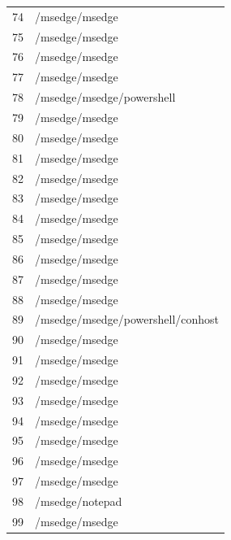 \documentclass[a4paper,twoside,12pt]{book}
\begin{document}
\begin{appendices}
\begin{table}
\begin{tabular}{ll}
		74  &                                     /msedge/msedge \\
		75  &                                     /msedge/msedge \\
		76  &                                     /msedge/msedge \\
		77  &                                     /msedge/msedge \\
		78  &                          /msedge/msedge/powershell \\
		79  &                                     /msedge/msedge \\
		80  &                                     /msedge/msedge \\
		81  &                                     /msedge/msedge \\
		82  &                                     /msedge/msedge \\
		83  &                                     /msedge/msedge \\
		84  &                                     /msedge/msedge \\
		85  &                                     /msedge/msedge \\
		86  &                                     /msedge/msedge \\
		87  &                                     /msedge/msedge \\
		88  &                                     /msedge/msedge \\
		89  &                  /msedge/msedge/powershell/conhost \\
		90  &                                     /msedge/msedge \\
		91  &                                     /msedge/msedge \\
		92  &                                     /msedge/msedge \\
		93  &                                     /msedge/msedge \\
		94  &                                     /msedge/msedge \\
		95  &                                     /msedge/msedge \\
		96  &                                     /msedge/msedge \\
		97  &                                     /msedge/msedge \\
		98  &                                    /msedge/notepad \\
		99  &                                     /msedge/msedge \\

\end{tabular}
\end{table}
\end{appendices}
\end{document}
